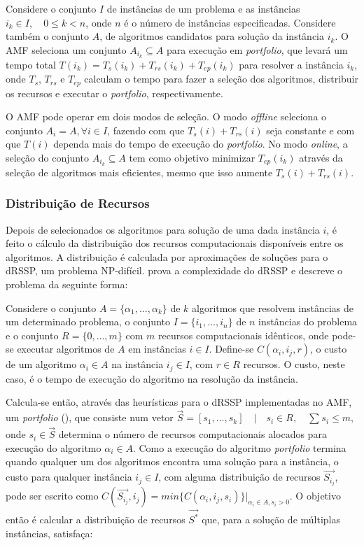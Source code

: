 \documentclass[a4paper, 12pt]{article}
\begin{document}
Considere o conjunto $I$ de instâncias de um problema e as instâncias $i_k \in
I, \quad 0 \leq k < n$, onde $n$ é o número de instâncias especificadas. 
Considere também o conjunto $A$, de algoritmos candidatos para solução da
instância $i_k$. O AMF seleciona um conjunto $A_{i_k} \subseteq A$ para
execução em \emph{portfolio}, que levará um tempo total $T(i_k) = 
T_s(i_k) + T_{rs}(i_k) + T_{ep}(i_k)$ para resolver a instância $i_k$,
onde $T_s$, $T_{rs}$ e $T_{ep}$ calculam o tempo para fazer a seleção
dos algoritmos, distribuir os recursos e executar o \emph{portfolio},
respectivamente.

O AMF pode operar em dois modos de seleção. O modo \emph{offline}
seleciona o conjunto $A_{i} = A, \forall i \in I$, fazendo com que
$T_s(i) + T_{rs}(i)$ seja constante e com que $T(i)$ dependa mais
do tempo de execução do \emph{portfolio}. No modo \emph{online},
a seleção do conjunto $A_{i_k} \subseteq A$ tem como objetivo minimizar
$T_{ep}(i_k)$ através da seleção de algoritmos mais eficientes, mesmo
que isso aumente $T_s(i) + T_{rs}(i)$.

\subsubsection{Distribuição de Recursos} \label{sec:drssp}

Depois de selecionados os algoritmos para solução de uma dada instância $i$,
é feito o cálculo da distribuição dos recursos computacionais disponíveis entre
os algoritmos. A distribuição é calculada por aproximações de soluções para
o dRSSP, um problema NP-difícil. \citet{bougeret2011approximating} prova a 
complexidade do dRSSP e descreve o problema da seguinte forma:

Considere o conjunto $A = \{\alpha_1, \dots, \alpha_k\}$ de $k$ algoritmos que
resolvem instâncias de um determinado problema, o conjunto $I = \{i_1, \dots, 
i_n\}$ de $n$ instâncias do problema e o conjunto $R = \{0, \dots, m\}$ com
$m$ recursos computacionais idênticos, onde pode-se executar algoritmos de $A$
em instâncias $i \in I$. Define-se $C(\alpha_i,i_j,r)$, o custo
de um algoritmo $\alpha_i \in A$ na instância $i_j \in I$, com $r \in R$ 
recursos. O custo, neste caso, é o tempo de execução do 
algoritmo na resolução da instância.

Calcula-se então, através das heurísticas para o dRSSP implementadas no AMF,
um \emph{portfolio} (\citet{huberman1997economics}),
que consiste num vetor $\overrightarrow{S} = [s_1, \dots, s_k] \quad | \quad 
s_i \in R, \quad \sum_{} s_i \leq m$, onde $s_i \in \overrightarrow{S}$ 
determina o número de recursos computacionais alocados para execução
do algoritmo $\alpha_i \in A$. Como a execução do algoritmo 
\emph{portfolio} termina quando qualquer um dos algoritmos encontra
uma solução para a instância, o custo para qualquer instância
$i_j \in I$, com alguma distribuição de recursos $\overrightarrow{S_{i_j}}$,
pode ser escrito como $C(\overrightarrow{S_{i_j}}, i_j) = 
min \{C(\alpha_i,i_j,s_i)\}|_{\alpha_i \in A, s_i > 0}$. O objetivo
então é calcular a distribuição de recursos $\overrightarrow{S^*}$ 
que, para a solução de múltiplas instâncias, satisfaça:
\end{document}
